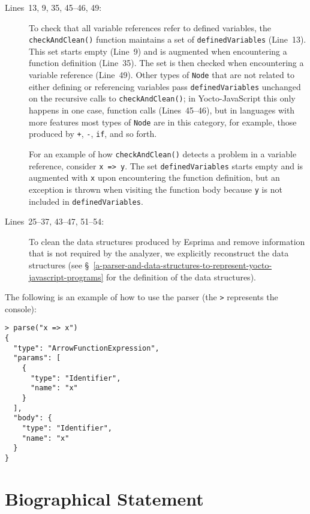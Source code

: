 \documentclass[12pt, oneside]{book}
\begin{document}
\begin{description}
\item [Lines~13, 9, 35, 45–46, 49:]

To check that all variable references refer to defined variables, the \texttt{checkAndClean()} function maintains a set of \texttt{definedVariables} (Line~13). This set starts empty (Line~9) and is augmented when encountering a function definition (Line~35). The set is then checked when encountering a variable reference (Line~49). Other types of \texttt{Node} that are not related to either defining or referencing variables pass \texttt{definedVariables} unchanged on the recursive calls to \texttt{checkAndClean()}; in Yocto-JavaScript this only happens in one case, function calls (Lines~45–46), but in languages with more features most types of \texttt{Node} are in this category, for example, those produced by \texttt{+}, \texttt{-}, \texttt{if}, and so forth.

For an example of how \texttt{checkAndClean()} detects a problem in a variable reference, consider \texttt{x => y}. The set \texttt{definedVariables} starts empty and is augmented with \texttt{x} upon encountering the function definition, but an exception is thrown when visiting the function body because \texttt{y} is not included in \texttt{definedVariables}.

\item [Lines~25–37, 43–47, 51–54:]

To clean the data structures produced by Esprima and remove information that is not required by the analyzer, we explicitly reconstruct the data structures (see §~\ref{a-parser-and-data-structures-to-represent-yocto-javascript-programs} for the definition of the data structures).
\end{description}

The following is an example of how to use the parser (the \texttt{>} represents the console):

\begin{verbatim}
> parse("x => x")
{
  "type": "ArrowFunctionExpression",
  "params": [
    {
      "type": "Identifier",
      "name": "x"
    }
  ],
  "body": {
    "type": "Identifier",
    "name": "x"
  }
}
\end{verbatim}

\backmatter




\chapter{Biographical Statement}

\end{document}
